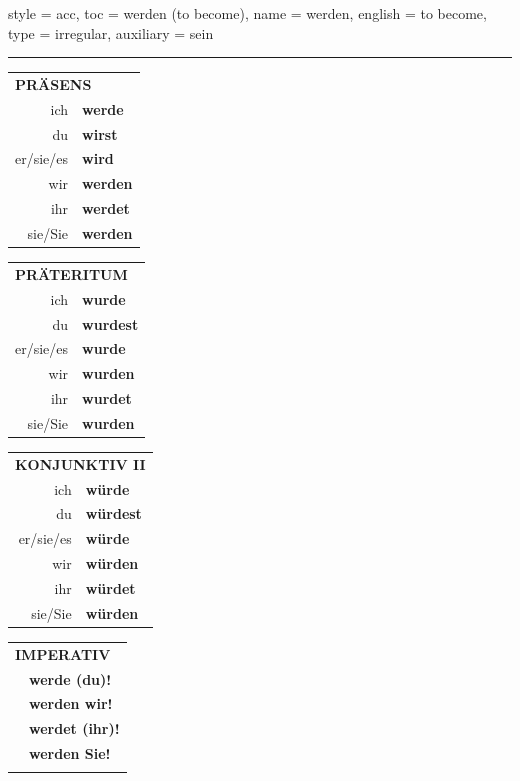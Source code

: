 \begin{verbentry}{
  style = {acc},
  toc = {werden (to become)},
  name = {werden},
  english = {to become},
  type = {irregular},
  auxiliary = {sein}
}
 
     \vspace{5pt}
    \hrule
    \vspace{5pt}
  \begin{tabular}{rl}
     \multicolumn{2}{l}{\textbf{PRÄSENS} }\\
    ich & \textbf{werde}\\
    du & \textbf{wirst}\\
    er/sie/es & \textbf{wird}\\
    wir & \textbf{werden}\\
    ihr & \textbf{werdet}\\
    sie/Sie & \textbf{werden}\\
  \end{tabular}
  \hfill
     \begin{tabular}{rl}
    \multicolumn{2}{l}{\textbf{PRÄTERITUM} }\\
    ich & \textbf{wurde}\\
    du & \textbf{wurdest}\\
    er/sie/es & \textbf{wurde}\\
    wir & \textbf{wurden}\\
    ihr & \textbf{wurdet}\\
    sie/Sie & \textbf{wurden}\\
  \end{tabular}
    \hfill
     \begin{tabular}{rl}
    \multicolumn{2}{l}{\textbf{KONJUNKTIV II} }\\
    ich & \textbf{würde}\\
    du & \textbf{würdest}\\
    er/sie/es & \textbf{würde}\\
    wir & \textbf{würden}\\
    ihr & \textbf{würdet}\\
    sie/Sie & \textbf{würden}\\
  \end{tabular}
  \hfill
  \begin{tabular}{rl}
     \multicolumn{2}{l}{\textbf{IMPERATIV} }\\
   & \textbf{werde (du)!}\\
   & \textbf{werden wir!}\\
   & \textbf{werdet (ihr)!}\\
   & \textbf{werden Sie!}\\
   & \vspace{10pt}
  \end{tabular}


\end{verbentry}
